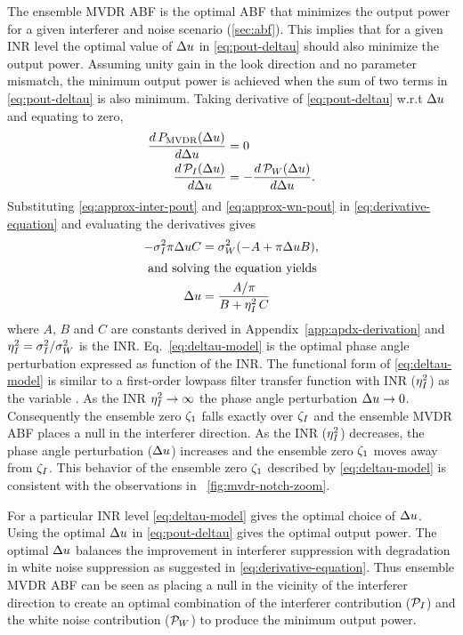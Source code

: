 The ensemble MVDR ABF is the optimal ABF that minimizes the output
power for a given interferer and noise scenario
(\sect{}\ref{sec:abf}). This implies that for a given INR level the
optimal value of $\Delta u$ in \eqref{eq:pout-deltau} should also
minimize the output power. Assuming unity gain in the look direction
and no parameter mismatch, the minimum output power is achieved when
the sum of two terms in \eqref{eq:pout-deltau} is also minimum. Taking
derivative of \eqref{eq:pout-deltau} w.r.t $\Delta u$ and equating to
zero,
\begin{align}
  \label{eq:derivative-equation}
  \frac{d\,P_{\rm MVDR}(\Delta u)}{d\Delta u} &= 0 \nonumber \\
 \frac{d\,\mathcal{P}_I(\Delta u)}{d\Delta u} &= -\frac{d\,\mathcal{P}_W(\Delta u)}{d\Delta u}.
\end{align}
Substituting \eqref{eq:approx-inter-pout} and \eqref{eq:approx-wn-pout} in \eqref{eq:derivative-equation} and evaluating the derivatives gives
\begin{align}
\label{eq:deltau-model}
-\sigma_I^2 \pi\Delta u C &=  \sigma^2_W (-A + \pi\Delta u B),
\nonumber \\
\intertext{ and solving the equation yields}
\Delta u &= \frac{A/\pi}{B + \eta^2_I \, C}
\end{align}
where $A$, $B$ and $C$ are constants derived in
Appendix~\ref{app:apdx-derivation} and $\eta^2_I = \sigma_I^2/\sigma^2_W$
is the INR. Eq.~\eqref{eq:deltau-model} is the optimal phase angle
perturbation expressed as function of the INR. The functional form of
\eqref{eq:deltau-model} is similar to a first-order lowpass filter
transfer function with INR ($\eta^2_I$) as the variable
\cite{Oppenheim1989}. As the INR $\eta^2_I\rightarrow \infty$ the phase
angle perturbation $\Delta u \rightarrow 0$. Consequently the ensemble
zero $\zeta_1$ falls exactly over $\zeta_I$ and the ensemble MVDR ABF
places a null in the interferer direction. As the INR ($\eta^2_I$)
decreases, the phase angle perturbation ($\Delta u$) increases and the
ensemble zero $\zeta_1$ moves away from $\zeta_I$. This behavior of
the ensemble zero $\zeta_1$ described by \eqref{eq:deltau-model} is
consistent with the observations in
\figurename{}~\ref{fig:mvdr-notch-zoom}.

For a particular INR level \eqref{eq:deltau-model} gives the optimal
choice of $\Delta u$. Using the optimal $\Delta u$ in
\eqref{eq:pout-deltau} gives the optimal output power. The optimal
$\Delta u$ balances the improvement in interferer suppression with
degradation in white noise suppression as suggested in
\eqref{eq:derivative-equation}. Thus ensemble MVDR ABF can be seen as
placing a null in the vicinity of the interferer direction to create
an optimal combination of the interferer contribution ($\mathcal{P}_I$)
and the white noise contribution ($\mathcal{P}_W$) to produce the minimum
output power.

